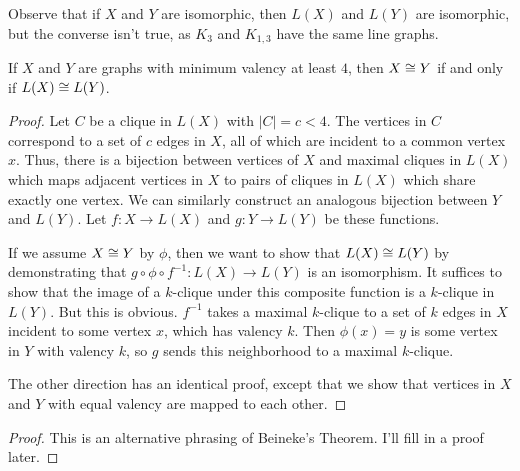 Observe that if $X$ and $Y$ are isomorphic, then $L(X)$ and $L(Y)$ are isomorphic, but the converse isn't true, as $K_3$ and $K_{1,3}$ have the same line graphs.

\begin{lemma}
	
{If $X$ and $Y$ are graphs with minimum valency at least $4$, then $X\cong Y$ if and only if $L(X)\cong L(Y)$.}
\end{lemma}
\begin{proof}
	Let $C$ be a clique in $L(X)$ with $|C|=c<4$.  The vertices in $C$ correspond to a set of $c$ edges in $X$, all of which are incident to a common vertex $x$.  Thus, there is a bijection between vertices of $X$ and maximal cliques in $L(X)$ which maps adjacent vertices in $X$ to pairs of cliques in $L(X)$ which share exactly one vertex.  We can similarly construct an analogous bijection between $Y$ and $L(Y)$.  Let $f:X\rightarrow L(X)$ and $g:Y\rightarrow L(Y)$ be these functions.
	
	If we assume $X\cong Y$ by $\phi$, then we want to show that $L(X)\cong L(Y)$ by demonstrating that $g\circ\phi\circ f^{-1}:L(X)\rightarrow L(Y)$ is an isomorphism.  It suffices to show that the image of a $k$-clique under this composite function is a $k$-clique in $L(Y)$.  But this is obvious.  $f^{-1}$ takes a maximal $k$-clique to a set of $k$ edges in $X$ incident to some vertex $x$, which has valency $k$.  Then $\phi(x)=y$ is some vertex in $Y$ with valency $k$, so $g$ sends this neighborhood to a maximal $k$-clique.
	
	The other direction has an identical proof, except that we show that vertices in $X$ and $Y$ with equal valency are mapped to each other.
\end{proof}


\begin{proof}
	
	This is an alternative phrasing of Beineke's Theorem.  I'll fill in a proof later.
	
\end{proof}





